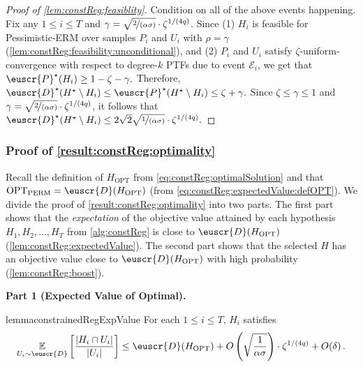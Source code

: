 \documentclass[11pt]{article}
\theoremstyle{plain}
\theoremstyle{definition}
\theoremstyle{remark}
\def\abs#1{\left| #1 \right|}
\newcommand{\inparen}[1]{\left(#1\right)}
\newcommand{\insquare}[1]{\left[#1\right]}
\newcommand{\evE}{\ensuremath{\mathscr{E}}}
\newcommand{\E}{\operatornamewithlimits{\mathbb{E}}}
\newcommand{\Ex}{\E}
\newcommand{\nfrac}[2]{\nicefrac{#1}{#2}}
\newcommand{\opt}{\ensuremath{\mathrm{OPT}}}
\newcommand{\customcal}[1]{\euscr{#1}}
\newcommand{\cD}{\customcal{D}}
\newcommand{\cP}{\customcal{P}}
\renewcommand{\paragraph}[1]{\medskip \noindent\textbf{#1}~}
\newcommand{\pERM}{Pessimistic-ERM}
\newcommand{\optset}{{H^\star}}
\newcommand{\cDtrue}{\cD^\star}
\newcommand{\cDgiven}{\cD}
\newcommand{\cPtrue}{\cP^\star}
\begin{document}
            \begin{proof}[Proof of \cref{lem:constReg:feasiblity}]
                Condition on all of the above events happening. 
                Fix any $1\leq i\leq T$ and $\gamma=\sqrt{\nfrac{2}{(\alpha\sigma)} }\cdot \zeta^{1/(4q)}$.
                Since (1) $H_i$ is feasible for \pERM{} over samples $P_i$ and $U_i$ with $\rho={\gamma}$ (\cref{lem:constReg:feasibility:unconditional}), and (2) $P_i$ and $U_i$ satisfy $\zeta$-uniform-convergence with respect to degree-$k$ PTFs due to event $\evE_i$, 
                we get that $\cPtrue(H_i)\geq 1-\zeta-\gamma.$
                Therefore, $\cDtrue(\optset\setminus H_i)\leq \cPtrue(\optset\setminus H_i)\leq \zeta + \gamma.$
                Since $\zeta\leq \gamma\leq 1$ and $\gamma=\sqrt{\nfrac{2}{(\alpha\sigma)} }\cdot \zeta^{1/(4q)}$, it follows that $\cDtrue(\optset\setminus H_i)\leq 2\sqrt{2}\sqrt{\nfrac{1}{(\alpha\sigma)}}\cdot \zeta^{1/(4q)}.$
            \end{proof}
            
            
        \subsubsection{Proof of \cref{result:constReg:optimality}}
            Recall the definition of $H_{\opt}$ from \cref{eq:constReg:optimalSolution} and that $\opt_{\rm PERM} = \cD(H_{\opt})$ (from \cref{eq:constReg:expectedValue:defOPT}).
            We divide the proof of \cref{result:constReg:optimality} into two parts.
            The first part shows that the \textit{expectation} of the objective value attained by each hypothesis $H_1,H_2,\dots,H_T$ from \cref{alg:constReg} is close to $\cD(H_{\opt})$ (\cref{lem:constReg:expectedValue}).
            The second part shows that the selected $H$ has an objective value close to $\cD(H_{\opt})$ with high probability (\cref{lem:constReg:boost}).

            

        \paragraph{Part 1 (Expected Value of Optimal).}
            \begin{restatable}{lemma}{constrainedRegExpValue}\label{lem:constReg:expectedValue}
                For each $1\leq i\leq T$, $H_i$ satisfies
                \[
                    \Ex_{U_i\sim \cDgiven}\insquare{
                        \frac{\abs{H_i\cap U_i}}{\abs{U_i}} 
                    }
                    \leq 
                    \cD(H_{\opt})
                    + O\inparen{\sqrt{\frac{1}{\alpha\sigma}}} \cdot \zeta^{1/(4q)}
                    + O(\delta)
                    \,. 
                \]
            \end{restatable}   
\end{document}
